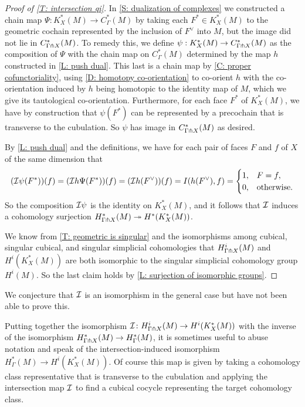 \begin{proof}[Proof of \cref{T: intersection qi}]
	In \cref{S: dualization of complexes} we constructed a chain map $\Psi \colon K_X^*(M) \to C_\Gamma^*(M)$ by taking each $F^* \in K^*_X(M)$ to the geometric cochain represented by the inclusion of $F^\vee$ into $M$, but the image did not lie in $C^*_{\Gamma \pitchfork X}(M)$.
	To remedy this, we define $\psi:K_X^*(M) \to C_{\Gamma \pitchfork X}^*(M)$ as the composition of $\Psi$ with the chain map on $C^*_{\Gamma}(M)$ determined by the map $h$ constructed in \cref{L: push dual}.
	This last is a chain map by \cref{C: proper cofunctoriality}, using \cref{D: homotopy co-orientation} to co-orient $h$ with the co-orientation induced by $h$ being homotopic to the identity map of $M$, which we give its tautological co-orientation.
	Furthermore, for each face $F^*$ of $K_X^*(M)$, we have by construction that $\psi(F^*)$ can be represented by a precochain that is transverse to the cubulation.
	So $\psi$ has image in $C_{\Gamma \pitchfork X}^*(M)$ as desired.

	By \cref{L: push dual} and the definitions, we have for each pair of faces $F$ and $f$ of $X$ of the same dimension that
	\begin{equation*}
		(\mathcal{I} \psi(F^*))(f) = (\mathcal{I} h \Psi(F^*))(f)\\
		= (\mathcal{I} h (F^\vee))(f)\\
		= I( h (F^\vee) , f) \\
		=
		\begin{cases}
			1, & F=f,\\
			0, & \text{otherwise.}
		\end{cases}
	\end{equation*}
	So the composition $\mathcal{I} \psi$ is the identity on $K^*_X(M)$, and it follows that $\mathcal{I}$ induces a cohomology surjection $H^*_{\Gamma \pitchfork X}(M)\twoheadrightarrow H^*(K_X^*(M))$.

	We know from \cref{T: geometric is singular} and the isomorphisms among cubical, singular cubical, and singular simplicial cohomologies that $H^i_{\Gamma \pitchfork X}(M)$ and $H^i(K_X^*(M))$ are both isomorphic to the singular simplicial cohomology group $H^i(M)$.
	So the last claim holds by \cref{L: surjection of isomorphic groups}.
\end{proof}

We conjecture that $\mathcal{I}$ is an isomorphism in the general case but have not been able to prove this.

\begin{remark}\label{R: intersection map extension}
	Putting together the isomorphism $\mathcal{I} \colon H^i_{\Gamma \pitchfork X}(M) \to H^i(K_X^*(M))$ with the inverse of the isomorphism $H^*_{\Gamma \pitchfork X}(M) \to H^*_\Gamma(M)$, it is sometimes useful to abuse notation and speak of the intersection-induced isomorphism
	$H^*_\Gamma(M) \to H^i(K_X^*(M))$.
	Of course this map is given by taking a cohomology class representative that is transverse to the cubulation and applying the intersection map $\mathcal{I}$ to find a cubical cocycle representing the target cohomology class.
\end{remark}
